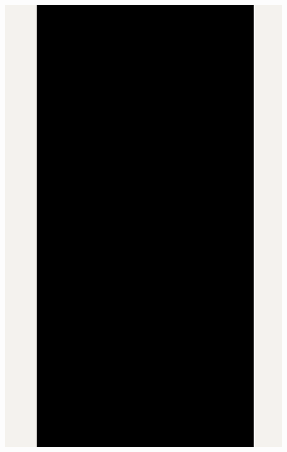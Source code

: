 \Continuing
\begin{center}
    \includegraphics[width=33em]{gde-google-interviewer-linkedin-p2_public}
\end{center}

\pagebreak

